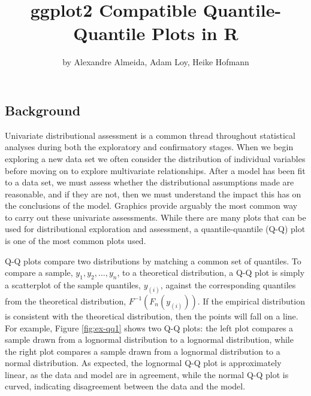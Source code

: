 \title{ggplot2 Compatible Quantile-Quantile Plots in R}
\author{by Alexandre Almeida, Adam Loy, Heike Hofmann}

\maketitle



\newcommand{\hh}[1]{{\textcolor{orange}{#1}}}
\newcommand{\al}[1]{{\textcolor{violet}{#1}}}
\newcommand{\Aa}[1]{{\textcolor{olive}{#1}}}

\hypertarget{background}{%
\subsection{Background}\label{background}}

\label{sec:background}

Univariate distributional assessment is a common thread throughout
statistical analyses during both the exploratory and confirmatory
stages. When we begin exploring a new data set we often consider the
distribution of individual variables before moving on to explore
multivariate relationships. After a model has been fit to a data set, we
must assess whether the distributional assumptions made are reasonable,
and if they are not, then we must understand the impact this has on the
conclusions of the model. Graphics provide arguably the most common way
to carry out these univariate assessments. While there are many plots
that can be used for distributional exploration and assessment, a
quantile-quantile (Q-Q) plot \citep{Wilk1968-ii} is one of the most
common plots used.

Q-Q plots compare two distributions by matching a common set of
quantiles. To compare a sample, \(y_1, y_2, \ldots, y_n\), to a
theoretical distribution, a Q-Q plot is simply a scatterplot of the
sample quantiles, \(y_{(i)}\), against the corresponding quantiles from
the theoretical distribution, \(F^{-1}\left( F_n(y_{(i)}) \right)\). If
the empirical distribution is consistent with the theoretical
distribution, then the points will fall on a line. For example, Figure
\ref{fig:ex-qq1} shows two Q-Q plots: the left plot compares a sample
drawn from a lognormal distribution to a lognormal distribution, while
the right plot compares a sample drawn from a lognormal distribution to
a normal distribution. As expected, the lognormal Q-Q plot is
approximately linear, as the data and model are in agreement, while the
normal Q-Q plot is curved, indicating disagreement between the data and
the model.

